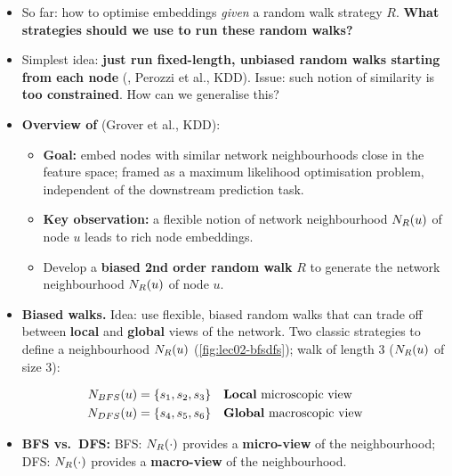\begin{itemize}
  \item So far: how to optimise embeddings \emph{given} a random walk strategy
    $R$. \textbf{What strategies should we use to run these random walks?}
  \item Simplest idea: \textbf{just run fixed-length, unbiased random walks
    starting from each node} (, Perozzi et al., KDD). Issue: such
    notion of similarity is \textbf{too constrained}. How can we generalise this?
  \item \textbf{Overview of } (Grover et al., KDD):
    \begin{itemize}
      \item \textbf{Goal:} embed nodes with similar network neighbourhoods close
        in the feature space; framed as a maximum likelihood optimisation
        problem, independent of the downstream prediction task.
      \item \textbf{Key observation:} a flexible notion of network neighbourhood
        $N_R(u)$ of node $u$ leads to rich node embeddings.
      \item Develop a \textbf{biased 2nd order random walk} $R$ to generate the
        network neighbourhood $N_R(u)$ of node $u$.
    \end{itemize}
  \item \textbf{Biased walks.} Idea: use flexible, biased random walks that can
    trade off between \textbf{local} and \textbf{global} views of the network.
    Two classic strategies to define a neighbourhood $N_R(u)$
    (\cref{fig:lec02-bfsdfs}); walk of length 3 ($N_R(u)$ of size 3):
\end{itemize}
\begin{align}
  N_{BFS}(u)&=\{s_1,s_2,s_3\} &&\text{\textbf{Local} microscopic view}\label{eq:lec02-bfs}\\
  N_{DFS}(u)&=\{s_4,s_5,s_6\} &&\text{\textbf{Global} macroscopic view}\label{eq:lec02-dfs}
\end{align}
\begin{itemize}
  \item \textbf{BFS vs.\ DFS:} BFS: $N_R(\cdot)$ provides a \textbf{micro-view}
    of the neighbourhood; DFS: $N_R(\cdot)$ provides a \textbf{macro-view} of the
    neighbourhood.
\end{itemize}

